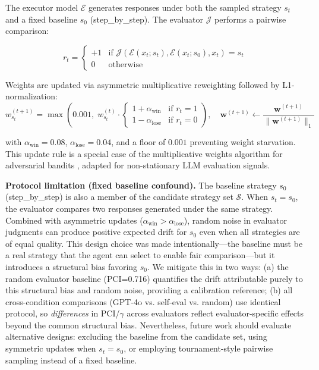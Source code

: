 \documentclass[11pt,a4paper]{article}
\begin{document}
The executor model $\mathcal{E}$ generates responses under both the sampled strategy $s_t$ and a fixed baseline $s_0$ (step\_by\_step). The evaluator $\mathcal{J}$ performs a pairwise comparison:

\begin{equation}
r_t = \begin{cases}
+1 & \text{if } \mathcal{J}(\mathcal{E}(x_t; s_t), \mathcal{E}(x_t; s_0), x_t) = s_t \\
0 & \text{otherwise}
\end{cases}
\end{equation}

Weights are updated via asymmetric multiplicative reweighting followed by L1-normalization:
\begin{equation}
w_{s_t}^{(t+1)} = \max\left(0.001,\; w_{s_t}^{(t)} \cdot \begin{cases}
1 + \alpha_{\text{win}} & \text{if } r_t = 1 \\
1 - \alpha_{\text{lose}} & \text{if } r_t = 0
\end{cases}\right), \quad
\mathbf{w}^{(t+1)} \leftarrow \frac{\mathbf{w}^{(t+1)}}{\|\mathbf{w}^{(t+1)}\|_1}
\end{equation}

with $\alpha_{\text{win}} = 0.08$, $\alpha_{\text{lose}} = 0.04$, and a floor of $0.001$ preventing weight starvation. This update rule is a special case of the multiplicative weights algorithm for adversarial bandits \cite{arora2012multiplicative}, adapted for non-stationary LLM evaluation signals.

\textbf{Protocol limitation (fixed baseline confound).} The baseline strategy $s_0$ (step\_by\_step) is also a member of the candidate strategy set $\mathcal{S}$. When $s_t = s_0$, the evaluator compares two responses generated under the same strategy. Combined with asymmetric updates ($\alpha_{\text{win}} > \alpha_{\text{lose}}$), random noise in evaluator judgments can produce positive expected drift for $s_0$ even when all strategies are of equal quality. This design choice was made intentionally---the baseline must be a real strategy that the agent can select to enable fair comparison---but it introduces a structural bias favoring $s_0$. We mitigate this in two ways: (a) the random evaluator baseline (PCI=0.716) quantifies the drift attributable purely to this structural bias and random noise, providing a calibration reference; (b) all cross-condition comparisons (GPT-4o vs. self-eval vs. random) use identical protocol, so \textit{differences} in PCI/$\gamma$ across evaluators reflect evaluator-specific effects beyond the common structural bias. Nevertheless, future work should evaluate alternative designs: excluding the baseline from the candidate set, using symmetric updates when $s_t = s_0$, or employing tournament-style pairwise sampling instead of a fixed baseline.
\end{document}
